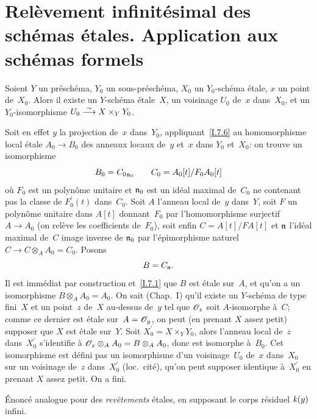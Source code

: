 \section[Rel\`evement infinit\'esimal des sch\'emas \'etales]{Rel\`evement infinit\'esimal des sch\'emas \'etales.
Application aux sch\'emas formels}
\label{I.8}

\begin{proposition}
\label{I.8.1}
Soient $Y$ un pr\'esch\'ema, $Y_0$ un sous-pr\'esch\'ema,
$X_0$ un $Y_0$-sch\'ema \'etale, $x$ un point de~$X_0$. Alors il
existe un $Y$-sch\'ema \'etale~$X$, un voisinage $U_0$ de~$x$
dans~$X_0$, et un $Y_0$-isomorphisme $U_0 \overset{\sim}{\longrightarrow} X \times_Y Y_0$.
\end{proposition}

Soit en effet $y$ la projection de~$x$ dans~$Y_0$,
appliquant~\ref{I.7.6} au homomorphisme local \'etale $A_0 \to B_0$
des anneaux locaux de~$y$ et~$x$ dans $Y_0$ et~$X_0$: on trouve un
isomorphisme$$
B_0 = {C_0}_{\mathfrak{n}_0}\qquad C_0 = A_0[t]/F_0A_0[t]
$$
o\`u $F_0$ est un polyn\^ome unitaire et $\mathfrak{n}_0$ est un
id\'eal maximal de~$C_0$ ne contenant pas la classe de
$F^\prime_0(t)$ dans~$C_0$. Soit $A$ l'anneau local de~$y$ dans~$Y$,
soit $F$ un polyn\^ome unitaire dans $A[t]$ donnant~$F_0$ par
l'homomorphisme surjectif $A \to A_0$ (on rel\`eve les coefficients
de~$F_0$), soit enfin
$C = A[t]/FA[t]$
et $\mathfrak{n}$ l'id\'eal maximal
de~$C$
image inverse de
$\mathfrak{n}_0$
par l'\'epimorphisme naturel $C \to C \otimes_A A_0 = C_0$. Posons
$$
B = C_\mathfrak{n}.
$$
Il est imm\'ediat par construction et~\ref{I.7.1} que $B$ est
\'etale sur~$A$, et qu'on a un isomorphisme $B \otimes_A A_0 =
A_0$. On sait (Chap.\, I)
qu'il existe un $Y$-sch\'ema de type fini~$X$ et un point~$z$ de~$X$
au-dessus de~$y$ tel que $\cal{O}_z$ soit $A$-isomorphe \`a~$C$;
comme ce dernier est \'etale sur~$A = \cal{O}_y$, on peut (en
prenant $X$ assez petit) supposer que $X$ est \'etale sur~$Y$. Soit
$X_0^\prime = X \times_Y Y_0$, alors l'anneau local de~$z$
dans~$X_0^\prime$ s'identifie \`a $\cal{O}_z \otimes_A A_0 = B
\otimes_A A_0$, donc est isomorphe \`a~$B_0$. Cet isomorphisme est
d\'efini pas un isomorphisme d'un voisinage~$U_0$ de~$x$ dans~$X_0$
sur un voisinage de~$z$ dans~$X_0^\prime$ (loc.\ cit\'e), qu'on peut
supposer identique \`a~$X_0^\prime$ en prenant $X$ assez petit. On a
fini.

\begin{corollaire}
\label{I.8.2}
\'Enonc\'e analogue pour des \emph{revêtements} \'etales, en
supposant le corps r\'esiduel $\mathit{k}(y)$ infini.
\end{corollaire}

